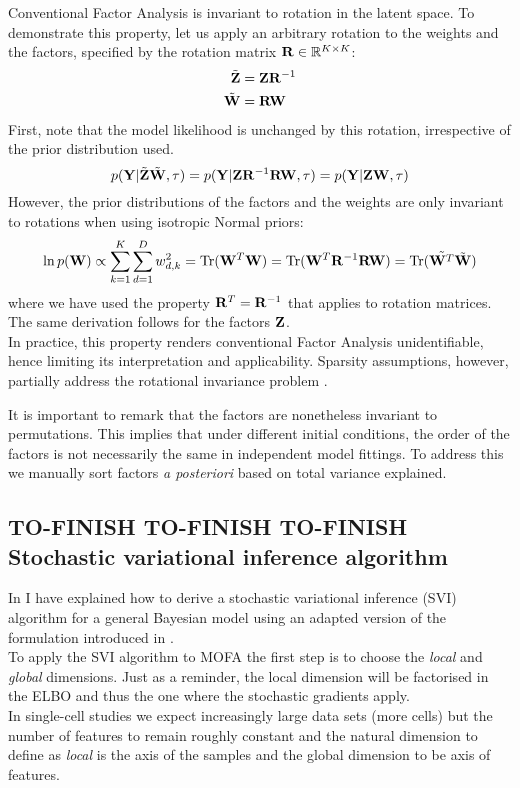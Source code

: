 Conventional Factor Analysis is invariant to rotation in the latent space\cite{Zhao2009}. To demonstrate this property, let us apply an arbitrary rotation to the weights and the factors, specified by the rotation matrix ${\bf R} \in \mathbb{R}^{K \times K}$:
\begin{align*}
	\tilde{{\bf Z}} &= {\bf Z} {\bf R}^{-1} \\
	\tilde{{\bf W}} &= {\bf R} {\bf W}
\end{align*}
First, note that the model likelihood is unchanged by this rotation, irrespective of the prior distribution used.
\begin{equation*}
		p({\bf Y} | \tilde{{\bf Z}} \tilde{{\bf W}}, \tau) = p({\bf Y} | {\bf Z} {\bf R}^{-1} {\bf R} {\bf W}, \tau) = p({\bf Y} | {\bf Z} {\bf W}, \tau)
\end{equation*}
However, the prior distributions of the factors and the weights are only invariant to rotations when using isotropic Normal priors:
\begin{equation*}
	\ln p({\bf W}) \propto \sum_{k=1}^{K} \sum_{d=1}^{D} w_{d,k}^2 = \mathrm{Tr}({\bf W}^T {\bf W}) = \mathrm{Tr}({\bf W}^T {\bf R}^{-1} {\bf R} {\bf W}) = \mathrm{Tr}(\tilde{{\bf W}^T} \tilde{{\bf W}})
\end{equation*}
where we have used the property ${\bf R}^{T} = {\bf R}^{-1}$ that applies to rotation matrices. The same derivation follows for the factors ${\bf Z}$.\\
In practice, this property renders conventional Factor Analysis unidentifiable, hence limiting its interpretation and applicability. Sparsity assumptions, however, partially address the rotational invariance problem \cite{Hore2015}.

It is important to remark that the factors are nonetheless invariant to permutations. This implies that under different initial conditions, the order of the factors is not necessarily the same in independent model fittings. To address this we manually sort factors \textit{a posteriori} based on total variance explained.


\subsection{TO-FINISH TO-FINISH TO-FINISH Stochastic variational inference algorithm}

In  I have explained how to derive a stochastic variational inference (SVI) algorithm for a general Bayesian model using an adapted version of the formulation introduced in \cite{Hoffman2012}.\\
To apply the SVI algorithm to MOFA the first step is to choose the \textit{local} and \textit{global} dimensions. Just as a reminder, the local dimension will be factorised in the ELBO and thus the one where the stochastic gradients apply.\\
In single-cell studies we expect increasingly large data sets (more cells) but the number of features to remain roughly constant and the natural dimension to define as \textit{local} is the axis of the samples and the global dimension to be axis of features.

